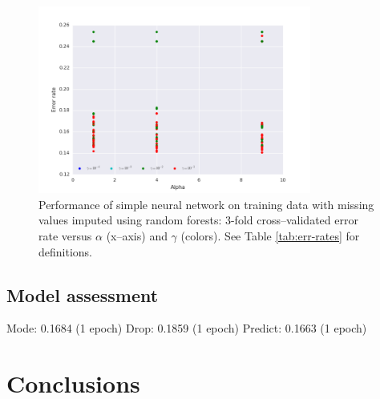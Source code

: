 \documentclass[10pt,twocolumn,letterpaper]{article}
\begin{document}
\begin{figure}[htbp] 
   \centering
   \includegraphics[width=0.8\textwidth]{./figure/predicted-simple-2d.png}
   \caption{Performance of simple neural network on training data with missing values imputed using random forests: 3-fold cross--validated error rate versus $\alpha$ (x--axis) and $\gamma$ (colors). See Table \ref{tab:err-rates} for definitions.}
   \label{fig:barplot-missing}
\end{figure}

\subsection{Model assessment}

Mode: 0.1684 (1 epoch)
Drop: 0.1859 (1 epoch)
Predict: 0.1663 (1 epoch) 

\section{Conclusions} \label{section:Con}


{\small


}
\end{document}
